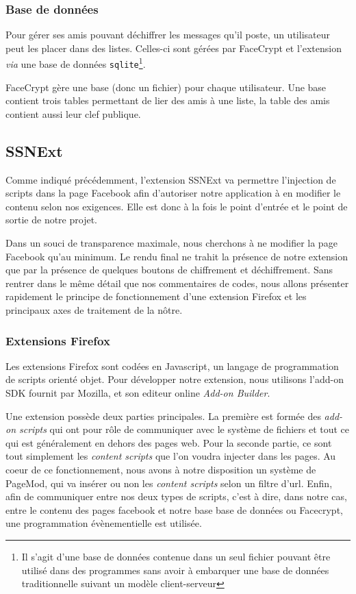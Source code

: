 \documentclass[a4paper,11pt,french]{article}
\begin{document}
\subsubsection{Base de données}
Pour gérer ses amis pouvant déchiffrer les messages qu'il poste, un utilisateur
peut les placer dans des listes. Celles-ci sont gérées par FaceCrypt et 
l'extension \emph{via} une base de données \texttt{sqlite}\footnote{Il s'agit
d'une base de données contenue dans un seul fichier pouvant être utilisé dans 
des programmes sans avoir à embarquer une base de données traditionnelle suivant
un modèle client-serveur}. 

FaceCrypt gère une base (donc un fichier) pour chaque utilisateur. Une base 
contient trois tables permettant de lier des amis à une liste, la table des 
amis contient aussi leur clef publique.

\subsection{SSNExt} 
Comme indiqué précédemment, l'extension SSNExt va permettre l'injection de 
scripts dans la page Facebook afin d'autoriser notre application à en modifier 
le contenu selon nos exigences. Elle est donc à la fois le point d'entrée et 
le point de sortie de notre projet. 

Dans un souci de transparence maximale, nous cherchons à ne modifier la page 
Facebook qu'au minimum. Le rendu final ne trahit la présence de notre extension 
que par la présence de quelques boutons de chiffrement et déchiffrement. Sans 
rentrer dans le même détail que nos commentaires de codes, nous allons présenter 
rapidement le principe de fonctionnement d'une extension Firefox et les principaux 
axes de traitement de la nôtre.

\subsubsection{Extensions Firefox}
Les extensions Firefox sont codées en Javascript, un langage de programmation de 
scripts orienté objet. Pour développer notre extension, nous utilisons l'add-on 
SDK fournit par Mozilla, et son editeur online \emph{Add-on Builder}.

Une extension possède deux parties principales. La première est formée des 
\emph{add-on scripts} qui ont pour rôle de communiquer avec le système de fichiers 
et tout ce qui est généralement en dehors des pages web. Pour la seconde partie, 
ce sont tout simplement les \emph{content scripts} que l'on voudra injecter dans
les pages. Au coeur de ce fonctionnement, nous avons à notre disposition un système 
de PageMod, qui va insérer ou non les \emph{content scripts} selon un filtre d'url. 
Enfin, afin de communiquer entre nos deux types de scripts, c'est à dire, dans notre
cas, entre le contenu des pages facebook et notre base base de données ou Facecrypt, 
une programmation évènementielle est utilisée.
\end{document}
